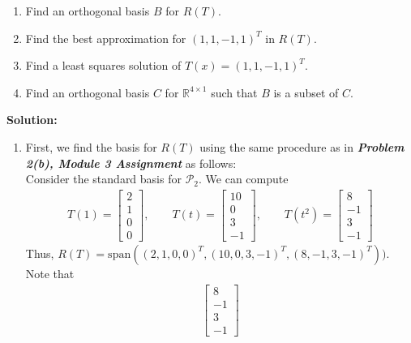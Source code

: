 \documentclass{uofa-eng-assignment}
\begin{document}
\begin{enumerate}
	      \begin{enumerate}
	      	\item Find an orthogonal basis $B$ for $R(T)$.
	      	\item Find the best approximation for $(1, 1, -1, 1)^T$ in $R(T)$.
	      	\item Find a least squares solution of $T(x) = (1, 1, -1, 1)^T$.
	      	\item Find an orthogonal basis $C$ for $\mathbb{R}^{4\times 1}$ such that $B$ is a subset of $C$.
	      \end{enumerate}
	      \textbf{Solution:}       
	      \begin{enumerate}
	      	\item First, we find the basis for $R(T)$ using the same procedure as in \textbf{\textit{Problem 2(b), Module 3 Assignment}} as follows: \\
	      	      Consider the standard basis for  $\mathcal{P}_2$. We can compute
	      	      \begin{align*}
	      	      	T(1) = \begin{bmatrix}   
	      	      	2                        \\ 1 \\ 0 \\ 0
	      	      	\end{bmatrix}, \qquad    
	      	      	T(t) = \begin{bmatrix}   
	      	      	10                       \\ 0 \\ 3 \\ -1
	      	      	\end{bmatrix}, \qquad    
	      	      	T(t^2) = \begin{bmatrix} 
	      	      	8                        \\ -1 \\ 3 \\ -1
	      	      	\end{bmatrix}            
	      	      \end{align*}
	      	      Thus, $R(T) = \text{span}((2, 1, 0, 0)^T, (10, 0, 3, -1)^T, (8, -1, 3, -1)^T))$. \\ Note that
	      	      \begin{align*}
	      	      	\begin{bmatrix} 
	      	      	8               \\ -1 \\ 3 \\ -1

\end{bmatrix}
\end{align*}
\end{enumerate}
\end{enumerate}
\end{document}
